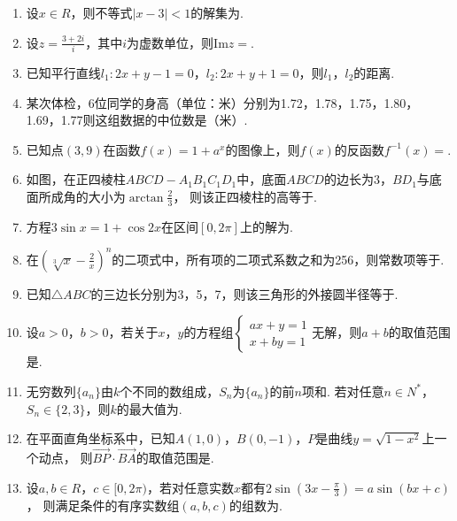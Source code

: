 \documentclass[12pt,space]{ctexart} %
\begin{document}
\begin{enumerate}[itemsep=-0.3em,topsep=0pt]
  \item 设$x\in R$，则不等式$|x-3|<1$的解集为.
  \item 设$\displaystyle{z=\frac{3+2i}{i}}$，其中$i$为虚数单位，则$\text{Im} z=$.
  \item 已知平行直线$l_1: 2x+y-1=0$，$l_2: 2x+y+1=0$，则$l_1$，$l_2$的距离.
  \item 某次体检，6位同学的身高（单位：米）分别为1.72，1.78，1.75，1.80，1.69，1.77则这组数据的中位数是（米）.
  \item 已知点$(3,9)$在函数$f(x)=1+a^x$的图像上，则$f(x)$的反函数$f^{-1}(x)=$.
  \item 如图，在正四棱柱$ABCD-A_1B_1C_1D_1$中，底面$ABCD$的边长为3，$BD_1$与底面所成角的大小为$\displaystyle{\arctan{\frac{2}{3}}}$，
        则该正四棱柱的高等于.
  \item 方程$3\sin x=1+\cos 2x$在区间$[0,2\pi]$上的解为.
  \item 在$\displaystyle{\left (\sqrt[3]{x}-\frac{2}{x}\right )^n}$的二项式中，所有项的二项式系数之和为256，则常数项等于.
  \item 已知$\triangle ABC$的三边长分别为3，5，7，则该三角形的外接圆半径等于.
  \item 设$a>0$，$b>0$，若关于$x$，$y$的方程组$\begin{cases}ax+y=1\\x+by=1\end{cases}$无解，则$a+b$的取值范围是\blank{$[2,+\infty)$}.
  \item 无穷数列$\{a_n\}$由$k$个不同的数组成，$S_n$为$\{a_n\}$的前$n$项和. 若对任意$n\in N^*$，$S_n\in \{2,3\}$，则$k$的最大值为.
  \item 在平面直角坐标系中，已知$A(1,0)$，$B(0,-1)$，$P$是曲线$y=\sqrt{1-x^2}$上一个动点，
        则$\overrightarrow{BP}\cdot \overrightarrow{BA}$的取值范围是\blank{$[0,1+\sqrt{2}]$}.
  \item 设$a,b\in R$，$c\in [0,2\pi)$，若对任意实数$x$都有$\displaystyle{2\sin\left (3x-\frac{\pi}{3}\right )=a\sin(bx+c)}$，
        则满足条件的有序实数组$(a,b,c)$的组数为.
\end{enumerate}


\clearpage
\end{document}
